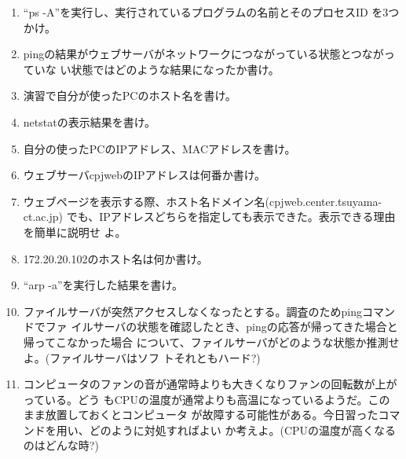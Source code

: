 \begin{enumerate}
\item ``ps -A''を実行し、実行されているプログラムの名前とそのプロセスID
を3つかけ。

\item pingの結果がウェブサーバがネットワークにつながっている状態とつながっていな
      い状態ではどのような結果になったか書け。

\item 演習で自分が使ったPCのホスト名を書け。

\item netstatの表示結果を書け。

\item 自分の使ったPCのIPアドレス、MACアドレスを書け。

\item ウェブサーバcpjwebのIPアドレスは何番か書け。

\item ウェブページを表示する際、ホスト名ドメイン名(cpjweb.center.tsuyama-ct.ac.jp)
      でも、IPアドレスどちらを指定しても表示できた。表示できる理由を簡単に説明せ
      よ。

\item 172.20.20.102のホスト名は何か書け。

\item ``arp -a''を実行した結果を書け。

\item ファイルサーバが突然アクセスしなくなったとする。調査のためpingコマンドでファ
      イルサーバの状態を確認したとき、pingの応答が帰ってきた場合と帰ってこなかった場合
      について、ファイルサーバがどのような状態か推測せよ。(ファイルサーバはソフ
      トそれともハード?)

\item コンピュータのファンの音が通常時よりも大きくなりファンの回転数が上がっている。どう
      もCPUの温度が通常よりも高温になっているようだ。このまま放置しておくとコンピュータ
      が故障する可能性がある。今日習ったコマンドを用い、どのように対処すればよい
      か考えよ。(CPUの温度が高くなるのはどんな時?)
\end{enumerate}
